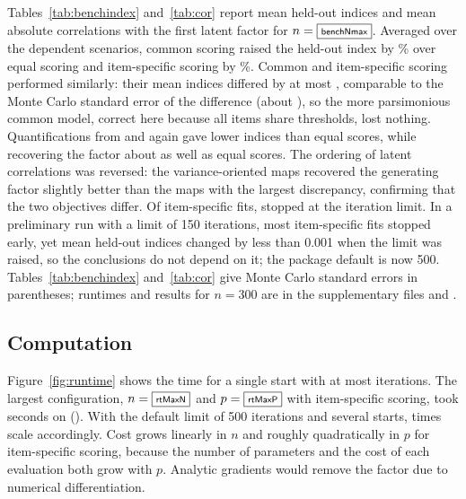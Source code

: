 Tables~\ref{tab:benchindex} and~\ref{tab:cor} report mean held-out indices and mean absolute correlations with the first latent factor for $n=\benchNmax$. Averaged over the dependent scenarios, common scoring raised the held-out index by \benchGainCommon\% over equal scoring and item-specific scoring by \benchGainItem\%. Common and item-specific scoring performed similarly: their mean indices differed by at most \benchCIDiffMax{}, comparable to the Monte Carlo standard error of the difference (about \benchCIMcseMax{}), so the more parsimonious common model, correct here because all items share thresholds, lost nothing. Quantifications from  and  again gave lower indices than equal scores, while recovering the factor about as well as equal scores. The ordering of latent correlations was reversed: the variance-oriented maps recovered the generating factor slightly better than the maps with the largest discrepancy, confirming that the two objectives differ. Of \benchItemRuns{} item-specific fits, \benchItemNonconv{} stopped at the iteration limit. In a preliminary run with a limit of 150 iterations, most item-specific fits stopped early, yet mean held-out indices changed by less than 0.001 when the limit was raised, so the conclusions do not depend on it; the package default is now 500. Tables~\ref{tab:benchindex} and~\ref{tab:cor} give Monte Carlo standard errors in parentheses; runtimes and results for $n=300$ are in the supplementary files  and .

\begin{table}[htbp]
\centering\small
{}
\caption{Mean held-out index by scenario and method, with Monte Carlo standard errors in parentheses ($n=\benchNmax$; \benchReps{} replications per scenario).}
\label{tab:benchindex}
\end{table}

\begin{table}[htbp]
\centering\small
{}
\caption{Mean absolute correlation between held-out projections and the first latent factor, with Monte Carlo standard errors in parentheses ($n=\benchNmax$).}
\label{tab:cor}
\end{table}

\subsection{Computation}
Figure~\ref{fig:runtime} shows the time for a single start with at most \rtMaxit{} iterations. The largest configuration, $n=\fbox{\scriptsize\textsf{rtMaxN}}$ and $p=\fbox{\scriptsize\textsf{rtMaxP}}$ with item-specific scoring, took \rtMaxSec{} seconds on \rtHardware{} (\code{\rtCPU}). With the default limit of 500 iterations and several starts, times scale accordingly. Cost grows linearly in $n$ and roughly quadratically in $p$ for item-specific scoring, because the number of parameters and the cost of each evaluation both grow with $p$. Analytic gradients would remove the factor due to numerical differentiation.

